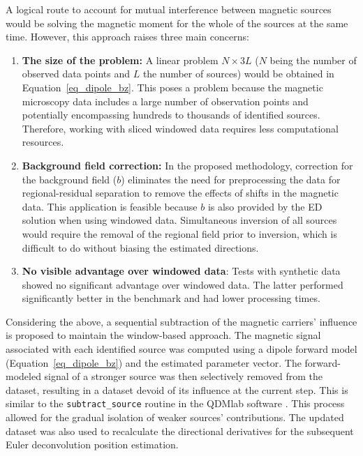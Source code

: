     A logical route to account for mutual interference between magnetic sources would be solving the magnetic moment for the whole of the sources at the same time. However, this approach raises three main concerns:
    
    \begin{enumerate}
        \item \textbf{The size of the problem:} A linear problem $N \times 3L$ ($N$ being the number of observed data points and $L$ the number of sources) would be obtained in Equation~\ref{eq_dipole_bz}. This poses a problem because the magnetic microscopy data includes a large number of observation points and potentially encompassing hundreds to thousands of identified sources. Therefore, working with sliced windowed data requires less computational resources.
        
        \item \textbf{Background field correction:} In the proposed methodology, correction for the background field ($b$) eliminates the need for preprocessing the data for regional-residual separation to remove the effects of shifts in the magnetic data. This application is feasible because $b$ is also provided by the ED solution when using windowed data. Simultaneous inversion of all sources would require the removal of the regional field prior to inversion, which is difficult to do without biasing the estimated directions.
        
        \item \textbf{No visible advantage over windowed data}: Tests with synthetic data \citep[see supplementary Jupyter notebooks in][]{figshare} showed no significant advantage over windowed data. The latter performed significantly better in the benchmark and had lower processing times.

    \end{enumerate}
    
    Considering the above, a sequential subtraction of the magnetic carriers' influence is proposed to maintain the window-based approach. The magnetic signal associated with each identified source was computed using a dipole forward model (Equation~\ref{eq_dipole_bz}) and the estimated parameter vector. The forward-modeled signal of a stronger source was then selectively removed from the dataset, resulting in a dataset devoid of its influence at the current step. 
    This is similar to the \texttt{subtract\_source} routine in the QDMlab software \citep{Volk2022}. This process allowed for the gradual isolation of weaker sources' contributions. The updated dataset was also used to recalculate the directional derivatives for the subsequent Euler deconvolution position estimation.

